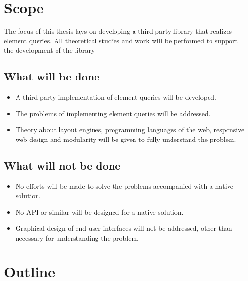 \documentclass[a4paper,11pt]{kth-mag}
\begin{document}
    \section{Scope}
      The focus of this thesis lays on developing a \gls{third-party} library that realizes element queries.
      All theoretical studies and work will be performed to support the development of the library.

      \subsection{What will be done}
      \begin{itemize}
      \item A \gls{third-party} implementation of element queries will be developed.
      \item The problems of implementing element queries  will be addressed.
      \item Theory about \glspl{layout engine}, programming languages of the web, \gls{responsive} \gls{web} design and modularity will be given to fully understand the problem.
      \end{itemize}

      \subsection{What will not be done}
      \begin{itemize}
      \item No efforts will be made to solve the problems accompanied with a \gls{native} solution.
      \item No \gls{API} or similar will be designed for a \gls{native} solution.
      \item Graphical design of end-user interfaces will not be addressed, other than necessary for understanding the problem.
      \end{itemize}
    \section{Outline}

\end{document}
